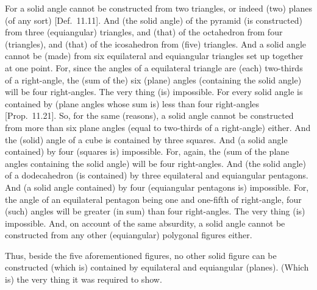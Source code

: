 \begin{Parallel}{}{}
{For a solid angle cannot be constructed from two triangles, or indeed (two) planes (of any sort) [Def.~11.11]. And (the solid angle) of the
pyramid (is constructed) from three (equiangular) triangles, and (that) of the octahedron
from four (triangles), and (that) of the icosahedron from (five) triangles. 
And a solid angle cannot be (made) from six equilateral and
equiangular triangles set up together at one point. For, since the angles of a
equilateral triangle are (each)  two-thirds of a right-angle, the (sum of the)
six  (plane) angles (containing the solid angle) will be four right-angles. The very thing (is) impossible.
For every solid angle is contained by (plane angles whose sum is) less than four right-angles [Prop.~11.21].  So, for the same (reasons), a solid angle cannot be constructed from more than six  plane angles (equal to two-thirds of a right-angle) either. And the (solid) angle of a cube
is contained by three squares. And (a solid angle contained) by four
(squares is) impossible. For, again, the (sum of the plane angles
containing the solid angle) will be four right-angles. And (the solid angle)
of a dodecahedron (is contained) by three equilateral and equiangular
pentagons. And (a solid angle contained) by four (equiangular
pentagons is) impossible. For, the angle of an equilateral
pentagon being one and one-fifth of right-angle, four (such) angles will be
greater (in sum) than four right-angles. The very thing (is) impossible. And, on account of the same absurdity, a solid angle cannot be constructed from any other
(equiangular) polygonal figures either.

Thus, beside the five aforementioned figures, no other solid figure can be constructed (which is) contained by equilateral and equiangular (planes).
(Which is) the very thing it was required to show.}
\end{Parallel}

